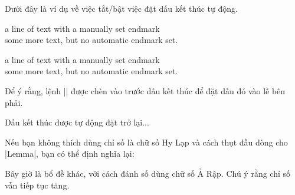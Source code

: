 Dưới đây là ví dụ về việc tắt/bật việc đặt dấu kết thúc tự động.

\begin{command}
  \begin{Theorem}\label{somelabel}
  a line of text with a manually set endmark \hfill\TheoremSymbol\\
  some more text, but no automatic endmark set. \NoEndMark
  \end{Theorem}
\end{command}

\begin{Theorem}\label{somelabel}
a line of text with a manually set endmark \hfill\TheoremSymbol \\
some more text, but no automatic endmark set. \NoEndMark
\end{Theorem}

Để ý rằng, lệnh |\hfill| được chèn vào trước dấu kết thúc
để đặt dấu đó vào lề bên phải.

\begin{Example}
Dấu kết thúc được tự động đặt trở lại...
\end{Example}

Nếu bạn không thích dùng chỉ số là chữ số Hy Lạp và cách thụt đầu dòng cho
|Lemma|, bạn có thể định nghĩa lại:
\theoremstyle{changebreak}
\theoremheaderfont{\normalfont\bfseries}\theorembodyfont{\slshape}
\theoremsymbol{\ensuremath{\heartsuit}}
\theoremsymbol{\ensuremath{\diamondsuit}}
\theoremseparator{:}
\begin{command}
  \theoremstyle{changebreak}
  \theoremheaderfont{\normalfont\bfseries}\theorembodyfont{\slshape}
  \theoremsymbol{\ensuremath{\heartsuit}}
  \theoremsymbol{\ensuremath{\diamondsuit}}
  \theoremseparator{:}
\end{command}
\begin{Lemma}
	Bây giờ là bổ đề khác, với cách đánh số dùng chữ số Ả Rập. Chú ý rằng
	chỉ số vẫn tiếp tục tăng.
\end{Lemma}

